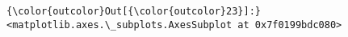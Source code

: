 \documentclass[11pt]{article}
\begin{document}
\begin{Verbatim}[commandchars=\\\{\}]
{\color{outcolor}Out[{\color{outcolor}23}]:} <matplotlib.axes.\_subplots.AxesSubplot at 0x7f0199bdc080>
\end{Verbatim}
            
    \begin{center}
    \end{center}
    { \hspace*{\fill} \\}
    

    
    
    
    
\end{document}
